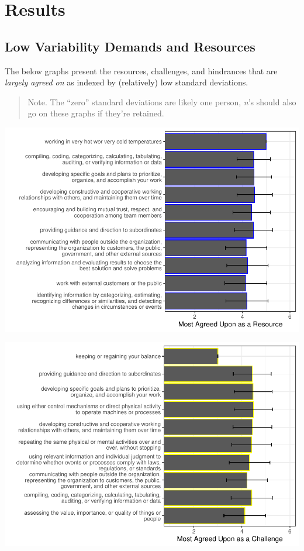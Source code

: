 \documentclass[
  english,
  man]{apa6}
\begin{document}
\hypertarget{results}{%
\section{Results}\label{results}}

\hypertarget{low-variability-demands-and-resources}{%
\subsection{Low Variability Demands and Resources}\label{low-variability-demands-and-resources}}

The below graphs present the resources, challenges, and hindrances that are \emph{largely agreed on} as indexed by (relatively) low standard deviations.

\begin{quote}
Note. The ``zero'' standard deviations are likely one person, \emph{n}'s should also go on these graphs if they're retained.
\end{quote}

\includegraphics{Submission_files/figure-latex/resourceslowsd-1.pdf}

\includegraphics{Submission_files/figure-latex/challengesagree-1.pdf}
\end{document}

